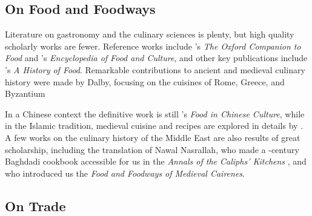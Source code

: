 










\subsection{On Food and Foodways}

Literature on gastronomy and the culinary sciences is plenty, but high quality scholarly works are fewer. Reference works include \textcite{davidson_oxford_2014}'s \textit{The Oxford Companion to Food} and \textcite{katz_encyclopedia_2003}'s \textit{Encyclopedia of Food and Culture}, and other key publications include \textcite{toussaint-samat_history_2009}'s \textit{A History of Food}. Remarkable contributions to ancient and medieval culinary history were made by Dalby, focusing on the cuisines of Rome, Greece, and Byzantium \autocite{dalby_siren_1996,dalby_tastes_2010,dalby_classical_1996,dalby_food_2003} 

In a Chinese context the definitive work is still \textcite{chang_food_1977}'s \textit{Food in Chinese Culture}, while in the Islamic tradition, medieval cuisine and recipes are explored in details by \textcite{zaouali_medieval_2007}. A few works on the culinary history of the Middle East are also results of great scholarship, including the translation of Nawal Nasrallah, who made a -century Baghdadi cookbook accessible for us in the \textit{Annals of the Caliphs' Kitchens} \autocite{ibn_sayyar_al-warraq_annals_2007}, and \textcite{lewicka_food_2011} who introduced us the \textit{Food and Foodways of Medieval Cairenes}.

\subsection{On Trade}

